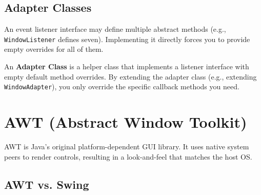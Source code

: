 \documentclass[12pt,a4paper]{article}
\begin{document}
\subsection{Adapter Classes}
An event listener interface may define multiple abstract methods (e.g., \texttt{WindowListener} defines seven). Implementing it directly forces you to provide empty overrides for all of them.

\begin{tcolorbox}[defbox, title={\textbf{Adapter Class Solution}}]
An \textbf{Adapter Class} is a helper class that implements a listener interface with empty default method overrides. By extending the adapter class (e.g., extending \texttt{WindowAdapter}), you only override the specific callback methods you need.
\end{tcolorbox}

\section{AWT (Abstract Window Toolkit)}

AWT is Java's original platform-dependent GUI library. It uses native system peers to render controls, resulting in a look-and-feel that matches the host OS.

\begin{tcolorbox}[tikzbox, title={AWT Component Class Hierarchy}]
\centering
{}
\end{tcolorbox}

\subsection{AWT vs. Swing}
\end{document}
